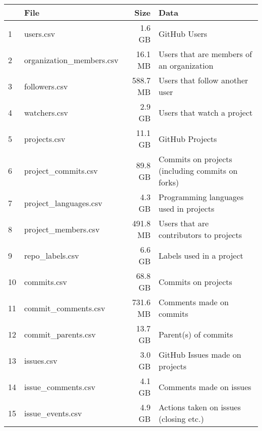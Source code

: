 \vspace{25px}
\begin{table}[htb]
    \centering
    \begin{tabular}{@{}llrl@{}}

        \toprule
             & File & Size & Data \\

        \midrule

           \rowcolor{LightCyan}
            1 & users.csv                   & 1.6 GB   & GitHub Users \\
            2 & organization\_members.csv   & 16.1 MB  & Users that are members of an organization \\
           \rowcolor{LightCyan}
            3 & followers.csv               & 588.7 MB & Users that follow another user \\
           \rowcolor{LightCyan}
            4 & watchers.csv                & 2.9 GB   & Users that watch a project \\
           \rowcolor{LightCyan}
            5 & projects.csv                & 11.1 GB  & GitHub Projects \\
            6 & project\_commits.csv        & 89.8 GB  & Commits on projects (including commits on forks) \\
           \rowcolor{LightCyan}
            7 & project\_languages.csv       & 4.3 GB   & Programming languages used in projects \\
           \rowcolor{LightCyan}
            8 & project\_members.csv        & 491.8 MB & Users that are contributors to projects \\
            9 & repo\_labels.csv            & 6.6 GB   & Labels used in a project \\
           \rowcolor{LightCyan}
           10 & commits.csv                 & 68.8 GB  & Commits on projects \\
           11 & commit\_comments.csv        & 731.6 MB & Comments made on commits \\
           12 & commit\_parents.csv         & 13.7 GB  & Parent(s) of commits \\
           \rowcolor{LightCyan}
           13 & issues.csv                  & 3.0 GB   & GitHub Issues made on projects \\
           14 & issue\_comments.csv         & 4.1 GB   & Comments made on issues \\
           15 & issue\_events.csv           & 4.9 GB   & Actions taken on issues (closing etc.) \\

\end{tabular}
\end{table}
